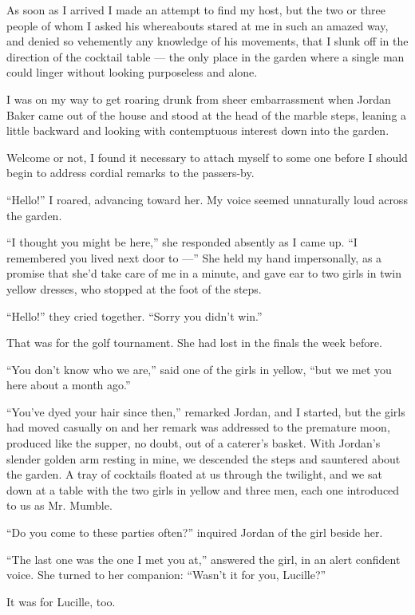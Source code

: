 \documentclass{znotebook}
\begin{document}
As soon as I arrived I made an attempt to find my host, but the two or three people of whom I asked his whereabouts stared at me in such an amazed way, and denied so vehemently any knowledge of his movements, that I slunk off in the direction of the cocktail table ---{} the only place in the garden where a single man could linger without looking purposeless and alone.

I was on my way to get roaring drunk from sheer embarrassment when Jordan Baker came out of the house and stood at the head of the marble steps, leaning a little backward and looking with contemptuous interest down into the garden.

Welcome or not, I found it necessary to attach myself to some one before I should begin to address cordial remarks to the passers-by.

``Hello!'' I roared, advancing toward her. My voice seemed unnaturally loud across the garden.

``I thought you might be here,'' she responded absently as I came up. ``I remembered you lived next door to ---'' She held my hand impersonally, as a promise that she'd take care of me in a minute, and gave ear to two girls in twin yellow dresses, who stopped at the foot of the steps.

``Hello!'' they cried together. ``Sorry you didn't win.''

That was for the golf tournament. She had lost in the finals the week before.

``You don't know who we are,'' said one of the girls in yellow, ``but we met you here about a month ago.''

``You've dyed your hair since then,'' remarked Jordan, and I started, but the girls had moved casually on and her remark was addressed to the premature moon, produced like the supper, no doubt, out of a caterer's basket. With Jordan's slender golden arm resting in mine, we descended the steps and sauntered about the garden. A tray of cocktails floated at us through the twilight, and we sat down at a table with the two girls in yellow and three men, each one introduced to us as Mr. Mumble.

``Do you come to these parties often?'' inquired Jordan of the girl beside her.

``The last one was the one I met you at,'' answered the girl, in an alert confident voice. She turned to her companion: ``Wasn't it for you, Lucille?''

It was for Lucille, too.
\end{document}

